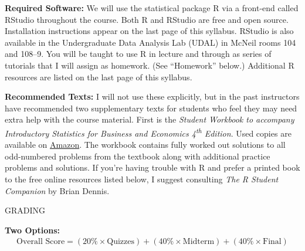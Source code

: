 \documentclass[11pt, letterpaper]{article}
\begin{document}
\noindent \textbf{Required Software:} 
We will use the statistical package R via a front-end called RStudio throughout the course. 
Both R and RStudio are free and open source. Installation instructions appear on the last page of this syllabus.
RStudio is also available in the Undergraduate Data Analysis Lab (UDAL) in McNeil rooms 104 and 108--9. 
You will be taught to use R in lecture and through as series of tutorials that I will assign as homework. (See ``Homework'' below.)  
Additional R resources are listed on the last page of this syllabus.

\medskip

\noindent \textbf{Recommended Texts:} 
I will not use these explicitly, but in the past instructors have recommended two
supplementary texts for students who feel they may need extra help with the course material. First is the \emph{Student Workbook to accompany Introductory Statistics for Business and Economics 4\textsuperscript{th} Edition}. 
Used copies are available on \href{http://www.amazon.com/gp/offer-listing/0471508993/sr=/qid=/ref=olp_page_2?ie=UTF8&colid=&coliid=&condition=all&me=&qid=&shipPromoFilter=0&sort=sip&sr=&startIndex=10}{Amazon}. 
The workbook contains fully worked out solutions to all odd-numbered problems from the textbook along with additional practice problems and solutions.
If you're having trouble with R and prefer a printed book to the free online resources listed below, I suggest consulting \emph{The R Student Companion} by Brian Dennis.


\newpage




\begin{center}
\small
GRADING
\end{center}

\noindent \textbf{Two Options:}
	\begin{equation*}
	\begin{split}
		\mbox{Overall Score} = (20\% \times \mbox{Quizzes})  + (40\% \times \mbox{Midterm}) + (40\% \times \mbox{Final})
	\end{split}
	\end{equation*}
\end{document}
